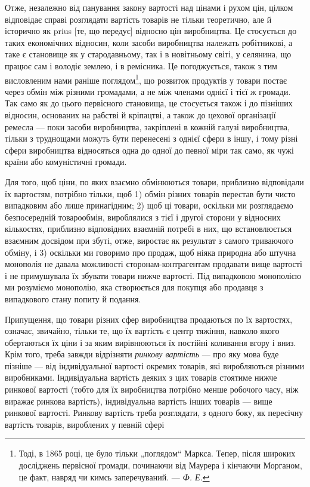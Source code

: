 
Отже, незалежно від панування закону вартості над цінами
і рухом цін, цілком відповідає справі розглядати вартість товарів
не тільки теоретично, але й історично як prius [те, що передує]
відносно цін виробництва. Це стосується до таких економічних
відносин, коли засоби виробництва належать робітникові,
а таке є становище як у стародавньому, так і в новітньому
світі, у селянина, що працює сам і володіє землею, і в ремісника.
Це погоджується, також з тим висловленим нами раніше
поглядом\footnote{
Тоді, в 1865 році, це було тільки „поглядом“ Маркса. Тепер, після широких
досліджень первісної громади, починаючи від Маурера і кінчаючи Морганом,
це факт, навряд чи кимсь заперечуваний. — \emph{Ф. Е.}
}, що розвиток продуктів у товари постає через обмін
між різними громадами, а не між членами однієї і тієї ж громади.
Так само як до цього первісного становища, це стосується
також і до пізніших відносин, основаних на рабстві
й кріпацтві, а також до цехової організації ремесла — поки засоби
виробництва, закріплені в кожній галузі виробництва, тільки
з труднощами можуть бути перенесені з однієї сфери в іншу,
і тому різні сфери виробництва відносяться одна до одної
до певної міри так само, як чужі країни або комуністичні
громади.

Для того, щоб ціни, по яких взаємно обмінюються товари,
приблизно відповідали їх вартостям, потрібно тільки, щоб 1) обмін
різних товарів перестав бути чисто випадковим або лише
принагідним; 2) щоб ці товари, оскільки ми розглядаємо безпосередній
товарообмін, вироблялися з тієї і другої сторони у відносних
кількостях, приблизно відповідних взаємній потребі в них,
що встановлюється взаємним досвідом при збуті, отже, виростає
як результат з самого триваючого обміну, і 3) оскільки ми
говоримо про продаж, щоб ніяка природна або штучна монополія
не давала можливості сторонам-контрагентам продавати
вище вартості і не примушувала їх збувати товари нижче вартості.
Під випадковою монополією ми розуміємо монополію, яка створюється
для покупця або продавця з випадкового стану попиту
й подання.

Припущення, що товари різних сфер виробництва продаються
по їх вартостях, означає, звичайно, тільки те, що їх вартість
є центр тяжіння, навколо якого обертаються їх ціни і за яким
вирівнюються їх постійні коливання вгору і вниз. Крім того,
треба завжди відрізняти \emph{ринкову вартість} — про яку мова буде
пізніше — від індивідуальної вартості окремих товарів, які виробляються
різними виробниками. Індивідуальна вартість деяких
з цих товарів стоятиме нижче ринкової вартості (тобто для їх
виробництва потрібно менше робочого часу, ніж виражає ринкова
вартість), індивідуальна вартість інших товарів — вище
ринкової вартості. Ринкову вартість треба розглядати, з одного
боку, як пересічну вартість товарів, вироблених у певній сфері
\parbreak{}  %
